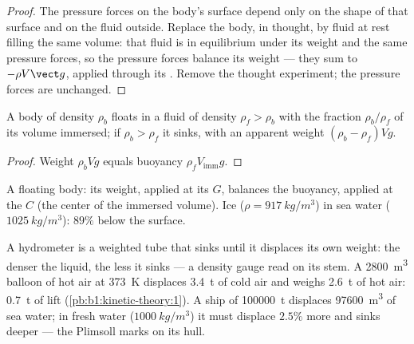 \begin{proof}
The pressure forces on the body's surface depend only on the shape of
that surface and on the fluid outside. Replace the body, in thought, by
fluid at rest filling the same volume: that fluid is in equilibrium
under its weight and the same pressure forces, so the pressure forces
balance its weight --- they sum to $-\rho V\vect g$, applied through its
. Remove the thought experiment; the pressure forces are
unchanged.
\end{proof}

\begin{corollary}[Floating]\label{cor:b1:fluid-statics:floating}
A body of density $\rho_b$ floats in a fluid of density $\rho_f > \rho_b$
with the fraction $\rho_b/\rho_f$ of its volume immersed; if $\rho_b >
\rho_f$ it sinks, with an apparent weight $(\rho_b - \rho_f)Vg$.
\end{corollary}

\begin{proof}
Weight $\rho_bVg$ equals buoyancy $\rho_fV_{\text{imm}}g$.
\end{proof}

\begin{omfigure}

{\small A floating body: its weight, applied at its  $G$,
balances the buoyancy, applied at the  $C$ (the
center of the immersed volume). Ice ($\rho = \qty{917}{kg/m^3}$) in sea
water ($\qty{1025}{kg/m^3}$): $89\%$ below the surface.}
\end{omfigure}

\begin{example}\label{ex:b1:fluid-statics:buoy}
A hydrometer is a weighted tube that sinks until it displaces its own
weight: the denser the liquid, the less it sinks --- a density gauge read
on its stem. A \qty{2800}{m^3} balloon of hot air at \qty{373}{K} displaces
\qty{3.4}{t} of cold air and weighs \qty{2.6}{t} of hot air: \qty{0.7}{t}
of lift (\cref{pb:b1:kinetic-theory:1}). A ship of \qty{100000}{t}
displaces \qty{97600}{m^3} of sea water; in fresh water ($\qty{1000}{kg/m^3}$)
it must displace $2.5\%$ more and sinks deeper --- the Plimsoll marks on
its hull.
\end{example}

